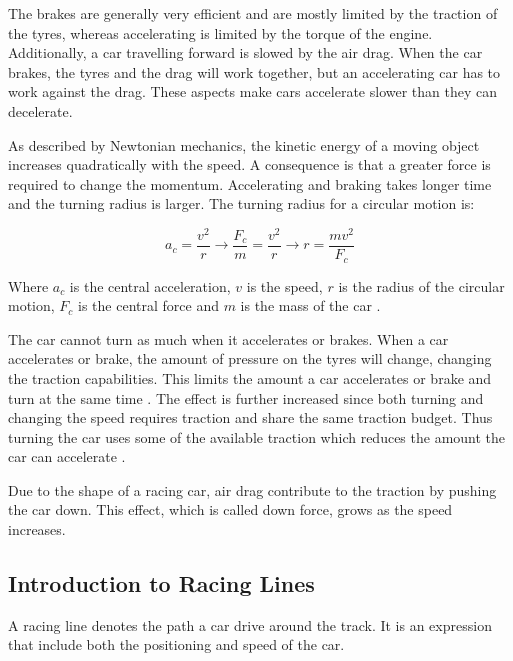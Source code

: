 The brakes are generally very efficient and are mostly limited by the traction of the tyres, whereas accelerating is limited by the torque of the engine. Additionally, a car travelling forward is slowed by the air drag. When the car brakes, the tyres and the drag will work together, but an accelerating car has to work against the drag. These aspects make cars accelerate slower than they can decelerate.

As described by Newtonian mechanics, the kinetic energy of a moving object increases quadratically with the speed. A consequence is that a greater force is required to change the momentum. Accelerating and braking takes longer time and the turning radius is larger. The turning radius for a circular motion is:

\begin{equation}
a_c = \frac{v^2}{r} 
\rightarrow
\frac{F_c}{m} = \frac{v^2}{r} 
\rightarrow
r = \frac{mv^2}{F_c}
\end{equation}

\noindent
Where $a_c$ is the central acceleration, $v$ is the speed, $r$ is the radius of the circular motion, $F_c$ is the central force and $m$ is the mass of the car \cite{beckman}. 

The car cannot turn as much when it accelerates or brakes. When a car accelerates or brake, the amount of pressure on the tyres will change, changing the traction capabilities. This limits the amount a car accelerates or brake and turn at the same time \cite{beckman}. The effect is further increased since both turning and changing the speed requires traction and share the same traction budget. Thus turning the car uses some of the available traction which reduces the amount the car can accelerate \cite{beckman}. 


Due to the shape of a racing car, air drag contribute to the traction by pushing the car down. This effect, which is called down force, grows as the speed increases.

\subsection{Introduction to Racing Lines}
A racing line denotes the path a car drive around the track. It is an expression that include both the positioning and speed of the car.

